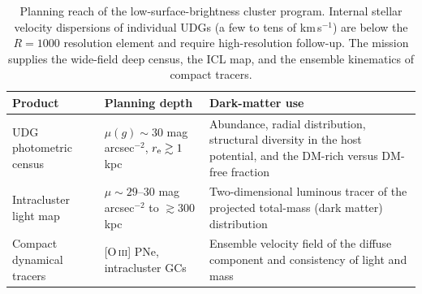 \documentclass[10pt,onecolumn]{article}
\begin{document}
\begin{table}[tp]
\centering
\sffamily\small
\begin{tabularx}{\textwidth}{@{}p{3.6cm}p{3.2cm}X@{}}
\toprule
\textbf{Product} & \textbf{Planning depth} & \textbf{Dark-matter use}\\
\midrule
UDG photometric census & $\mu(g)\sim30$ mag\,arcsec$^{-2}$, $r_{\rm e}\gtrsim1$\,kpc & Abundance, radial distribution, structural diversity in the host potential, and the DM-rich versus DM-free fraction\\
Intracluster light map & $\mu\sim29$--$30$ mag\,arcsec$^{-2}$ to $\gtrsim300$\,kpc & Two-dimensional luminous tracer of the projected total-mass (dark matter) distribution\\
Compact dynamical tracers & [O\,\textsc{iii}] PNe, intracluster GCs & Ensemble velocity field of the diffuse component and consistency of light and mass\\
\bottomrule
\end{tabularx}
\caption{Planning reach of the low-surface-brightness cluster program. Internal stellar velocity dispersions of individual UDGs (a few to tens of km\,s$^{-1}$) are below the $R=1000$ resolution element and require high-resolution follow-up. The mission supplies the wide-field deep census, the ICL map, and the ensemble kinematics of compact tracers.}
\label{tab:lsbreach}
\end{table}
\end{document}
